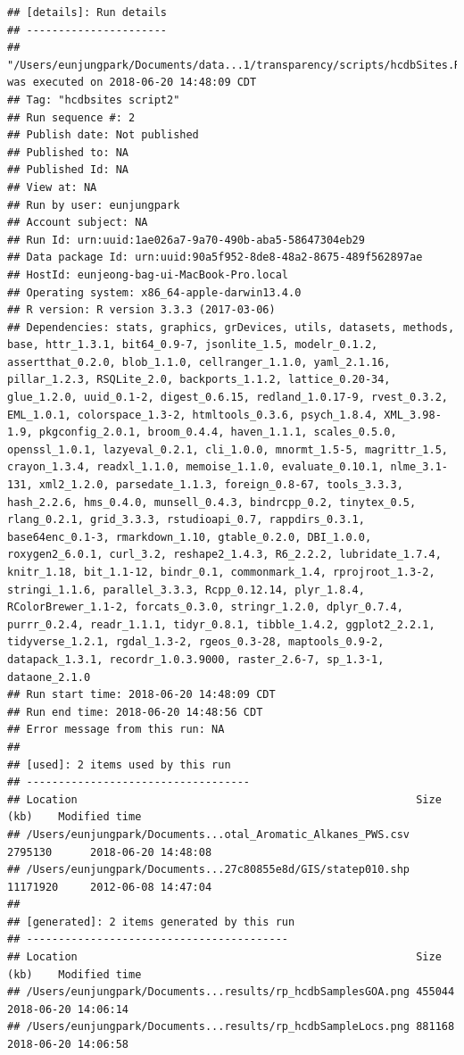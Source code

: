 \documentclass[]{article}
\begin{document}
\begin{verbatim}
## [details]: Run details
## ----------------------
## "/Users/eunjungpark/Documents/data...1/transparency/scripts/hcdbSites.R" was executed on 2018-06-20 14:48:09 CDT
## Tag: "hcdbsites script2"
## Run sequence #: 2
## Publish date: Not published
## Published to: NA
## Published Id: NA
## View at: NA
## Run by user: eunjungpark
## Account subject: NA
## Run Id: urn:uuid:1ae026a7-9a70-490b-aba5-58647304eb29
## Data package Id: urn:uuid:90a5f952-8de8-48a2-8675-489f562897ae
## HostId: eunjeong-bag-ui-MacBook-Pro.local
## Operating system: x86_64-apple-darwin13.4.0
## R version: R version 3.3.3 (2017-03-06)
## Dependencies: stats, graphics, grDevices, utils, datasets, methods, base, httr_1.3.1, bit64_0.9-7, jsonlite_1.5, modelr_0.1.2, assertthat_0.2.0, blob_1.1.0, cellranger_1.1.0, yaml_2.1.16, pillar_1.2.3, RSQLite_2.0, backports_1.1.2, lattice_0.20-34, glue_1.2.0, uuid_0.1-2, digest_0.6.15, redland_1.0.17-9, rvest_0.3.2, EML_1.0.1, colorspace_1.3-2, htmltools_0.3.6, psych_1.8.4, XML_3.98-1.9, pkgconfig_2.0.1, broom_0.4.4, haven_1.1.1, scales_0.5.0, openssl_1.0.1, lazyeval_0.2.1, cli_1.0.0, mnormt_1.5-5, magrittr_1.5, crayon_1.3.4, readxl_1.1.0, memoise_1.1.0, evaluate_0.10.1, nlme_3.1-131, xml2_1.2.0, parsedate_1.1.3, foreign_0.8-67, tools_3.3.3, hash_2.2.6, hms_0.4.0, munsell_0.4.3, bindrcpp_0.2, tinytex_0.5, rlang_0.2.1, grid_3.3.3, rstudioapi_0.7, rappdirs_0.3.1, base64enc_0.1-3, rmarkdown_1.10, gtable_0.2.0, DBI_1.0.0, roxygen2_6.0.1, curl_3.2, reshape2_1.4.3, R6_2.2.2, lubridate_1.7.4, knitr_1.18, bit_1.1-12, bindr_0.1, commonmark_1.4, rprojroot_1.3-2, stringi_1.1.6, parallel_3.3.3, Rcpp_0.12.14, plyr_1.8.4, RColorBrewer_1.1-2, forcats_0.3.0, stringr_1.2.0, dplyr_0.7.4, purrr_0.2.4, readr_1.1.1, tidyr_0.8.1, tibble_1.4.2, ggplot2_2.2.1, tidyverse_1.2.1, rgdal_1.3-2, rgeos_0.3-28, maptools_0.9-2, datapack_1.3.1, recordr_1.0.3.9000, raster_2.6-7, sp_1.3-1, dataone_2.1.0
## Run start time: 2018-06-20 14:48:09 CDT
## Run end time: 2018-06-20 14:48:56 CDT
## Error message from this run: NA
## 
## [used]: 2 items used by this run
## -----------------------------------
## Location                                                     Size (kb)    Modified time      
## /Users/eunjungpark/Documents...otal_Aromatic_Alkanes_PWS.csv 2795130      2018-06-20 14:48:08
## /Users/eunjungpark/Documents...27c80855e8d/GIS/statep010.shp 11171920     2012-06-08 14:47:04
## 
## [generated]: 2 items generated by this run
## -----------------------------------------
## Location                                                     Size (kb)    Modified time      
## /Users/eunjungpark/Documents...results/rp_hcdbSamplesGOA.png 455044       2018-06-20 14:06:14
## /Users/eunjungpark/Documents...results/rp_hcdbSampleLocs.png 881168       2018-06-20 14:06:58
\end{verbatim}
\end{document}
